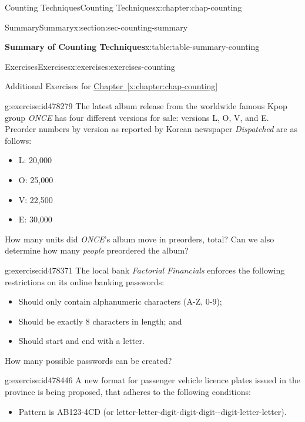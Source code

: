 \documentclass[oneside,10pt,]{book}
\newcommand{\xreffont}{\relax}
\numberwithin{equation}{section}
\begin{document}
\begin{chapterptx}{Counting Techniques}{}{Counting Techniques}{}{}{x:chapter:chap-counting}
\begin{sectionptx}{Summary}{}{Summary}{}{}{x:section:sec-counting-summary}
\begin{tableptx}{\textbf{Summary of Counting Techniques}}{x:table:table-summary-counting}{}
{}%
\end{tableptx}%
\end{sectionptx}
%
%
\typeout{************************************************}
\typeout{************************************************}
%
\begin{exercises-section}{Exercises}{}{Exercises}{}{}{x:exercises:exercises-counting}
\begin{introduction}{}%
Additional Exercises for \hyperref[x:chapter:chap-counting]{Chapter~{\xreffont\ref{x:chapter:chap-counting}}}%
\end{introduction}%
\begin{divisionexercise}{1}{}{}{g:exercise:id478279}%
The latest album release from the worldwide famous Kpop group \emph{ONCE} has four different versions for sale: versions L, O, V, and E. Preorder numbers by version as reported by Korean newspaper \emph{Dispatched} are as follows:%
\begin{itemize}[label=\textbullet]
\item{}L: 20,000%
\item{}O: 25,000%
\item{}V: 22,500%
\item{}E: 30,000%
\end{itemize}
How many units did \emph{ONCE}'s album move in preorders, total? Can we also determine how many \emph{people} preordered the album?%
\end{divisionexercise}%
\begin{divisionexercise}{2}{}{}{g:exercise:id478371}%
The local bank \emph{Factorial Financials} enforces the following restrictions on its online banking passwords:%
\begin{itemize}[label=\textbullet]
\item{}Should only contain alphanumeric characters (A-Z, 0-9);%
\item{}Should be exactly 8 characters in length; and%
\item{}Should start and end with a letter.%
\end{itemize}
How many possible passwords can be created?%
\end{divisionexercise}%
\begin{divisionexercise}{3}{}{}{g:exercise:id478446}%
A new format for passenger vehicle licence plates issued in the province is being proposed, that adheres to the following conditions:%
\begin{itemize}[label=\textbullet]
\item{}Pattern is AB123-4CD (or letter-letter-digit-digit-digit-{}-{}digit-letter-letter).%

\end{itemize}
\end{divisionexercise}
\end{exercises-section}
\end{chapterptx}
\end{document}
